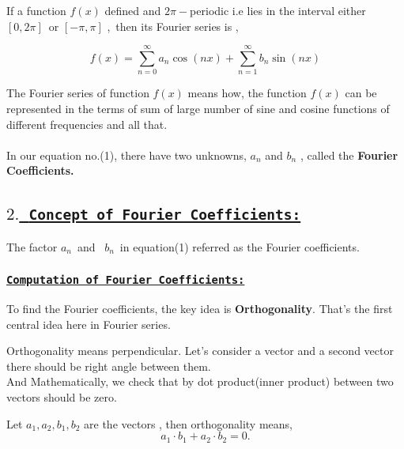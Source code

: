\documentclass[a4paper,12pt]{article}
\begin{document}
    If a function $f(x)$ defined and $2\pi  -$periodic i.e lies in the interval either $\left[0,2\pi\right]$\ or $\left[-\pi,\pi\right]$ ,\ then its Fourier series is , 

    \begin{equation*}
        f(x) = \sum_{n=0}^{\infty}a_{n}\cos\left(nx\right) + \sum_{n=1}^{\infty}b_{n}\sin\left(nx\right) \tag{1}
    \end{equation*}

    The Fourier series of function $f(x)$ means how, the function $f(x)$ can be represented in the terms of sum of large number of sine and cosine functions of different frequencies and all that. 

    \paragraph*{}

    In our equation no.(1), there have two unknowns, $a_{n}$ and $b_{n}$ , called the \textbf{Fourier Coefficients.}

    \subsection*{\underline{$2.$\ \texttt{\textbf{Concept of Fourier Coefficients:}}}}

    The factor $a_{n}$\ and \ $b_{n}$\ in equation(1) referred as the Fourier coefficients.

    \subsubsection*{\texttt{\underline{\textbf{Computation of Fourier Coefficients:}}}}

    To find the Fourier coefficients, the key idea is \textbf{Orthogonality}. That's the first central idea here in Fourier series.

    \begin{tcolorbox}[title=Some crucial fact about orthogonality]
        Orthogonality means perpendicular. Let's consider a vector and a second vector there should be right angle between them.\\
        And Mathematically, we check that by dot product(inner product) between two vectors should be zero.

        Let $a_{1}, a_{2}, b_{1}, b_{2}$ are the vectors , then orthogonality means, 
        $$a_{1}\cdot b_{1} + a_{2}\cdot b_{2} = 0.$$

    \end{tcolorbox}
\end{document}
